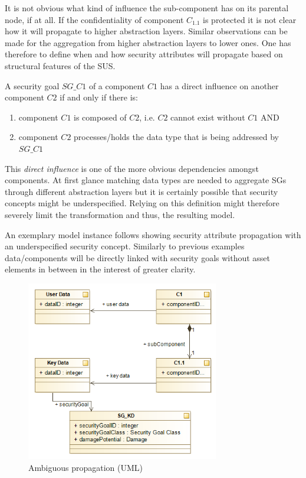 It is not obvious what kind of influence the sub-component has on its parental node, if at all. If the confidentiality of component $C_{1.1}$ is protected it is not clear how it will propagate to higher abstraction layers. Similar observations can be made for the aggregation from higher abstraction layers to lower ones. One has therefore to define when and how security attributes will propagate based on structural features of the SUS.

\begin{theorem}
A security goal $SG\_C1$ of a component $C1$ has a direct influence on another component $C2$ if and only if there is: 
\begin{enumerate}
\item component $C1$ is composed of $C2$, i.e. $C2$ cannot exist without $C1$ AND
\item component $C2$ processes/holds the data type that is being addressed by $SG\_C1$
\end{enumerate} 
\end{theorem}

This \textit{direct influence} is one of the more obvious dependencies amongst components. At first glance matching data types are needed to aggregate SGs through different abstraction layers but it is certainly possible that security concepts might be underspecified. Relying on this definition might therefore severely limit the transformation and thus, the resulting model.

An exemplary model instance follows showing security attribute propagation with an underspecified security concept. Similarly to previous examples data/components will be directly linked with security goals without asset elements in between in the interest of greater clarity.

\begin{figure}[H]
\centering
\includegraphics[width=0.75\textwidth]{pictures/sg_deduction.png}
\caption{Ambiguous propagation (UML)}
\label{fig:subcomponent_dilemma}
\end{figure} 

